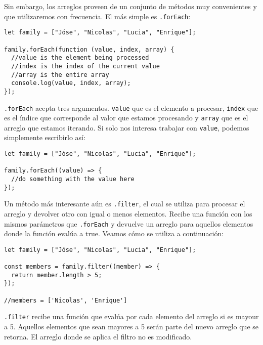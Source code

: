 \documentclass[a4paper, oneside, titlepage, 12pt]{paper}
\begin{document}
Sin embargo, los arreglos proveen de un conjunto de métodos muy convenientes y que utilizaremos con frecuencia. El más simple es \texttt{.forEach}:              
\begin{verbatim}
let family = ["Jóse", "Nicolas", "Lucia", "Enrique"];

family.forEach(function (value, index, array) {
  //value is the element being processed
  //index is the index of the current value
  //array is the entire array
  console.log(value, index, array);
});
\end{verbatim}

\texttt{.forEach} acepta tres argumentos. \texttt{value} que es el elemento a procesar, \texttt{index} que es el índice que corresponde al valor que estamos procesando y \texttt{array} que es el arreglo que estamos iterando. Si solo nos interesa trabajar con \texttt{value}, podemos simplemente escribirlo así:

\begin{verbatim}
let family = ["Jóse", "Nicolas", "Lucia", "Enrique"];

family.forEach((value) => {
  //do something with the value here	
});
\end{verbatim}

Un método más interesante aún es \texttt{.filter}, el cual se utiliza para procesar el arreglo y devolver otro con igual o menos elementos. Recibe una función con los mismos parámetros que \texttt{.forEach} y devuelve un arreglo para aquellos elementos donde la función evalúa a true. Veamos cómo se utiliza a continuación:

\begin{verbatim}
let family = ["Jóse", "Nicolas", "Lucia", "Enrique"];

const members = family.filter((member) => {
  return member.length > 5;
});

//members = ['Nicolas', 'Enrique']
\end{verbatim}

\texttt{.filter} recibe una función que evalúa por cada elemento del arreglo si es mayour a 5. Aquellos elementos que sean mayores a 5 serán parte del nuevo arreglo que se retorna. El arreglo donde se aplica el filtro no es modificado.
\end{document}
